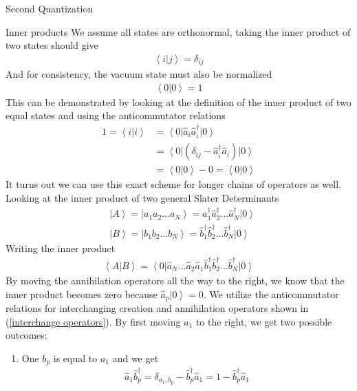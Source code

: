\documentclass[twoside,english]{uiofysmaster}
\begin{document}
\begin{chapter}{Second Quantization}
	\begin{section}{Inner products}
		We assume all states are orthonormal, taking the inner product of two states should give
		\begin{align}
			\left< i | j \right> = \delta_{ij}
		\end{align}
		And for consistency, the vacuum state must also be normalized
		\begin{align}
			\left< 0 | 0 \right> = 1
		\end{align}
		This can be demonstrated by looking at the definition of the inner product of two equal states and using the anticommutator relations
		\begin{align}
			1 = \left< i | i \right> &= \left< 0 \right| \hat a_i \hat a_i^\dagger \left| 0 \right> \\
									 &= \left< 0 \right| (\delta_{ij} - \hat a_i^\dagger \hat a_i) \left| 0 \right> \\
									 &= \left< 0 | 0 \right> - 0 = \left< 0 | 0 \right>
		\end{align}
		It turns out we can use this exact scheme for longer chains of operators as well. Looking at the inner product of two general Slater Determinants
		\begin{align}
			&\left| A \right> = \left| a_1 a_2 ... a_N \right> = \hat a_1^\dagger \hat a_2^\dagger ... \hat a_N^\dagger \left| 0 \right> \\
			&\left| B \right> = \left| b_1 b_2 ... b_N \right> = \hat b_1^\dagger \hat b_2^\dagger ... \hat b_N^\dagger \left| 0 \right>
		\end{align}
		Writing the inner product
		\begin{align}
			\left< A | B \right> = \left< 0 \right| \hat a_N ... \hat a_2 \hat a_1 \hat b_1^\dagger \hat b_2^\dagger ... \hat b_N^\dagger \left| 0 \right>
		\end{align}
		By moving the annihilation operators all the way to the right, we know that the inner product becomes zero because $\hat a_p \left| 0 \right> = 0$. We utilize the anticommutator relations for interchanging creation and annihilation operators shown in (\ref{interchange operators}). By first moving $a_1$ to the right, we get two possible outcomes:
		\begin{enumerate} 
			\item One $b_p$ is equal to $a_1$ and we get
			\begin{align}
				\hat a_1 \hat b_p^\dagger = \delta_{a_1,b_p} - \hat b_p^\dagger \hat a_1 = 1 - \hat b_p^\dagger \hat a_1 
				\label{InnerProduct1}

\end{align}
\end{enumerate}
\end{section}
\end{chapter}
\end{document}
